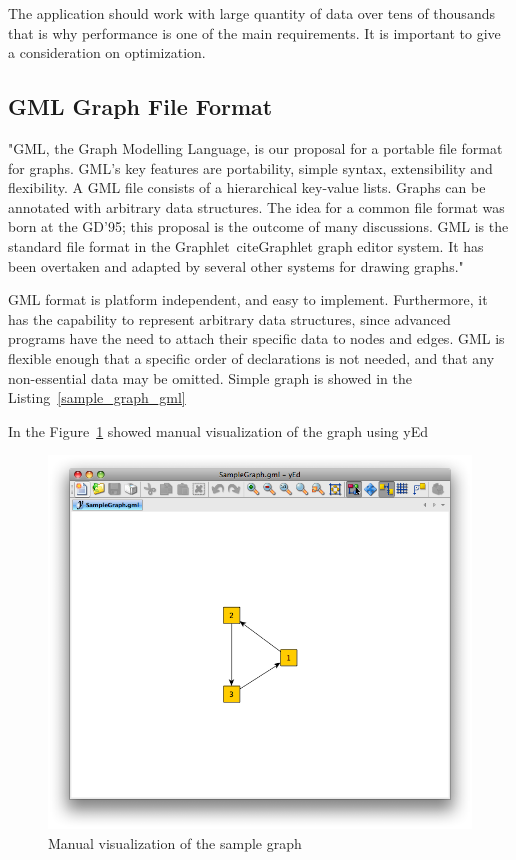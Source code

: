 \documentclass[a4paper,oneside]{article}
\begin{document}
The application should work with large quantity of data over tens of thousands that is why performance is one of the main requirements. It is important to give a consideration on optimization.

\subsection{GML Graph File Format}
 "GML, the Graph Modelling Language, is our proposal for a portable file format for graphs. GML's key features are portability, simple syntax, extensibility and flexibility. A GML file consists of a hierarchical key-value lists. Graphs can be annotated with arbitrary data structures. The idea for a common file format was born at the GD'95; this proposal is the outcome of many discussions. GML is the standard file format in the Graphlet~cite{Graphlet} graph editor system. It has been overtaken and adapted by several other systems for drawing graphs."~\cite{GML}
 
 
GML format is platform independent, and easy to implement. Furthermore, it has the capability to represent arbitrary data structures, since advanced programs have the need to attach their specific data to nodes and edges. GML is flexible enough that a specific order of declarations is not needed, and that any non-essential data may be omitted. Simple graph is showed in the Listing~\ref{sample_graph_gml}

\begin{center}
	
\end{center}

In the Figure~\ref{sample_graph_yed_vis} showed manual visualization of the graph using yEd~\cite{yEd}

\begin{figure}
\begin{center}
	\includegraphics[scale=0.5]{SampleGraph.png}
	\caption{Manual visualization of the sample graph}
	\label{sample_graph_yed_vis}
\end{center}
\end{figure}
\end{document}
